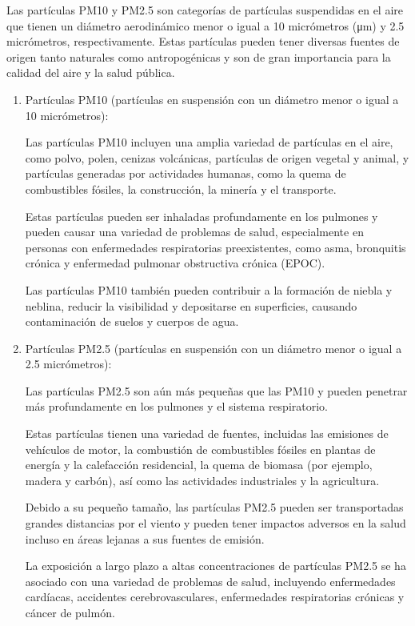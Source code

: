 \documentclass[12pt]{article}
\begin{document}
Las partículas PM10 y PM2.5 son categorías de partículas suspendidas en el aire que tienen un diámetro aerodinámico menor o igual a 10 micrómetros (\unit{\micro\meter}) y 2.5 micrómetros, respectivamente. Estas partículas pueden tener diversas fuentes de origen tanto naturales como antropogénicas y son de gran importancia para la calidad del aire y la salud pública.

\begin{enumerate}
\item Partículas PM10 (partículas en suspensión con un diámetro menor o igual a 10 micrómetros):

Las partículas PM10 incluyen una amplia variedad de partículas en el aire, como polvo, polen, cenizas volcánicas, partículas de origen vegetal y animal, y partículas generadas por actividades humanas, como la quema de combustibles fósiles, la construcción, la minería y el transporte.

Estas partículas pueden ser inhaladas profundamente en los pulmones y pueden causar una variedad de problemas de salud, especialmente en personas con enfermedades respiratorias preexistentes, como asma, bronquitis crónica y enfermedad pulmonar obstructiva crónica (EPOC).

Las partículas PM10 también pueden contribuir a la formación de niebla y neblina, reducir la visibilidad y depositarse en superficies, causando contaminación de suelos y cuerpos de agua.
\item Partículas PM2.5 (partículas en suspensión con un diámetro menor o igual a 2.5 micrómetros):

Las partículas PM2.5 son aún más pequeñas que las PM10 y pueden penetrar más profundamente en los pulmones y el sistema respiratorio.

Estas partículas tienen una variedad de fuentes, incluidas las emisiones de vehículos de motor, la combustión de combustibles fósiles en plantas de energía y la calefacción residencial, la quema de biomasa (por ejemplo, madera y carbón), así como las actividades industriales y la agricultura.

Debido a su pequeño tamaño, las partículas PM2.5 pueden ser transportadas grandes distancias por el viento y pueden tener impactos adversos en la salud incluso en áreas lejanas a sus fuentes de emisión.

La exposición a largo plazo a altas concentraciones de partículas PM2.5 se ha asociado con una variedad de problemas de salud, incluyendo enfermedades cardíacas, accidentes cerebrovasculares, enfermedades respiratorias crónicas y cáncer de pulmón.
\end{enumerate}
\end{document}
